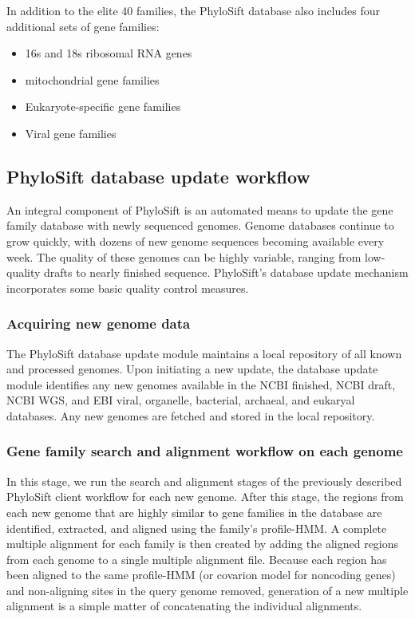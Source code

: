 \documentclass[10pt]{article}
\begin{document}
In addition to the elite 40 families, the PhyloSift database also includes four additional sets of gene families:
\begin{itemize}
\item 16s and 18s ribosomal {RNA} genes
\item mitochondrial gene families
\item Eukaryote-specific gene families
\item Viral gene families
\end{itemize}

\subsection*{PhyloSift database update workflow}\label{sec:dbupdate}
An integral component of PhyloSift is an automated means to update the gene family database with newly sequenced genomes.
Genome databases continue to grow quickly, with dozens of new genome sequences becoming available every week.
The quality of these genomes can be highly variable, ranging from low-quality drafts to nearly finished sequence.
PhyloSift's database update mechanism incorporates some basic quality control measures.
\subsubsection*{Acquiring new genome data}
The PhyloSift database update module maintains a local repository of all known and processed genomes.
Upon initiating a new update, the database update module identifies any new genomes available in the NCBI finished, NCBI draft, NCBI WGS, and EBI viral, organelle, bacterial, archaeal, and eukaryal databases.
Any new genomes are fetched and stored in the local repository.
\subsubsection*{Gene family search and alignment workflow on each genome}
In this stage, we run the search and alignment stages of the previously described PhyloSift client workflow for each new genome.
After this stage, the regions from each new genome that are highly similar to gene families in the database are identified, extracted, and aligned using the family's profile-HMM.
A complete multiple alignment for each family is then created by adding the aligned regions from each genome to a single multiple alignment file.
Because each region has been aligned to the same profile-HMM (or covarion model for noncoding genes) and non-aligning sites in the query genome removed, generation of a new multiple alignment is a simple matter of concatenating the individual alignments.
\end{document}
